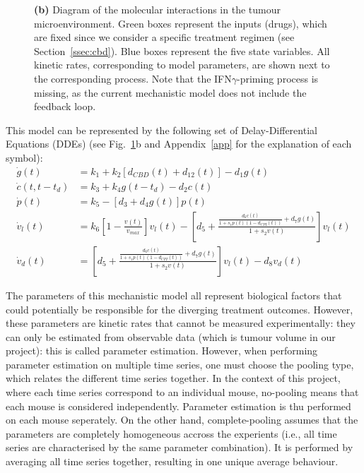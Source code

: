 \documentclass[11pt]{article}
\begin{document}
\begin{figure}[!ht]
{    \textbf{(b)} Diagram of the molecular interactions in the tumour microenvironment. Green boxes represent the inputs (drugs), which are fixed since we consider a specific treatment regimen (see Section~\ref{ssec:cbd}). Blue boxes represent the five state variables. All kinetic rates, corresponding to model parameters, are shown next to the corresponding process. Note that the IFN$\gamma$-priming process is missing, as the current mechanistic model does not include the feedback loop.}
    \label{fig:mech}
\end{figure}

This model can be represented by the following set of Delay-Differential Equations (DDEs) \cite{takuya} (see Fig.~\ref{fig:mech}b and Appendix~\ref{app} for the explanation of each symbol): 
\begin{align*}
    \dot{g}(t) &= k_1 + k_2 [d_{CBD}(t) + d_{12}(t)] - d_1g(t) \\ 
    \dot{c}(t,t-t_d) &= k_3 + k_4g(t-t_d)-d_2c(t) \\ 
    \dot{p}(t) &= k_5 - [d_3 + d_4g(t)]p(t) \\ 
    \dot{v}_l(t) &= k_6\left[1 - \frac{v(t)}{v_{max}} \right]v_l(t) - \left[d_5 + \frac{\frac{d_6c(t)}{1+s_1p(t)(1-d_{CPI}(t))}+d_7g(t)}{1+s_2v(t)}\right]v_l(t)\\
    \dot{v}_d(t) &= \left[d_5 + \frac{\frac{d_6c(t)}{1+s_1p(t)(1-d_{CPI}(t))}+d_7g(t)}{1+s_2v(t)}\right]v_l(t) - d_8 v_d(t)
\end{align*}

The parameters of this mechanistic model all represent biological factors that could potentially be responsible for the diverging treatment outcomes. However, these parameters are kinetic rates that cannot be measured experimentally: they can only be estimated from observable data (which is tumour volume in our project): this is called parameter estimation. However, when performing parameter estimation on multiple time series, one must choose the pooling type, which relates the different time series together. In the context of this project, where each time series correspond to an individual mouse, no-pooling means that each mouse is considered independently. Parameter estimation is thu performed on each mouse seperately. On the other hand, complete-pooling assumes that the parameters are completely homogeneous accross the experients (i.e., all time series are characterised by the same parameter combination). It is performed by averaging all time series together, resulting in one unique average behaviour. 
\end{document}
